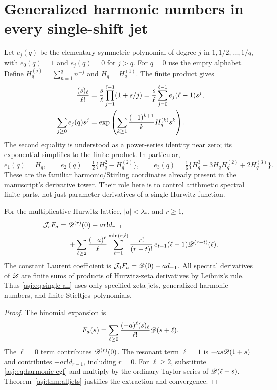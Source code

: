 \section{Generalized harmonic numbers in every single-shift jet}
\label{asj:sec:harmonic}

Let $e_j(q)$ be the elementary symmetric polynomial of degree $j$ in
$1,1/2,\ldots,1/q$, with $e_0(q)=1$ and $e_j(q)=0$ for $j>q$.
For $q=0$ use the empty alphabet. Define
$H_q^{(j)}=\sum_{n=1}^q n^{-j}$ and $H_q=H_q^{(1)}$.
The finite product gives
\begin{align}\label{asj:eq:harmonic-egf}
 \frac{(s)_\ell}{\ell!}
 &=\frac{s}{\ell}\prod_{j=1}^{\ell-1}(1+s/j)
   =\frac{s}{\ell}\sum_{j=0}^{\ell-1}e_j(\ell-1)s^j,\notag\\
 \sum_{j\ge0}e_j(q)s^j
 &=\exp\left(\sum_{k\ge1}\frac{(-1)^{k+1}}kH_q^{(k)}s^k\right).
\end{align}
The second equality is understood as a power-series identity near zero;
its exponential simplifies to the finite product. In particular,
\[
 e_1(q)=H_q,\qquad
 e_2(q)=\tfrac12\{H_q^2-H_q^{(2)}\},\qquad
 e_3(q)=\tfrac16\{H_q^3-3H_qH_q^{(2)}+2H_q^{(3)}\}.
\]
These are the familiar harmonic/Stirling coordinates already present in
the manuscript's derivative tower. Their role here is to control
arithmetic spectral finite parts, not just parameter derivatives of a
single Hurwitz function.

\begin{theorem}\label{asj:thm:harmonic}
For the multiplicative Hurwitz lattice, $|a|<\lambda_*$, and $r\ge1$,
\begin{align}\label{asj:eq:single-all}
 \mathcal J_r F_a
  ={}&\mathscr D^{(r)}(0)-a r!d_{r-1}\notag\\
   &+\sum_{\ell\ge2}\frac{(-a)^\ell}{\ell}
       \sum_{t=1}^{\min(r,\ell)}
         \frac{r!}{(r-t)!}\,e_{t-1}(\ell-1)
                                  \mathscr D^{(r-t)}(\ell).
\end{align}
The constant Laurent coefficient is
$\mathcal J_0F_a=\mathscr D(0)-a d_{-1}$. All spectral derivatives of $\mathscr D$
are finite sums of products of Hurwitz-zeta derivatives by Leibniz's
rule. Thus \eqref{asj:eq:single-all} uses only specified zeta jets,
generalized harmonic numbers, and finite Stieltjes polynomials.
\end{theorem}
\begin{proof}
The binomial expansion is
\[
 F_a(s)=\sum_{\ell\ge0}\frac{(-a)^\ell(s)_\ell}{\ell!}\mathscr D(s+\ell).
\]
The $\ell=0$ term contributes $\mathscr D^{(r)}(0)$. The resonant term $\ell=1$
is $-as\mathscr D(1+s)$ and contributes $-a r!d_{r-1}$, including $r=0$.
For $\ell\ge2$, substitute \eqref{asj:eq:harmonic-egf} and multiply by
the ordinary Taylor series of $\mathscr D(\ell+s)$. Theorem~\ref{asj:thm:alljets}
justifies the extraction and convergence.
\end{proof}

